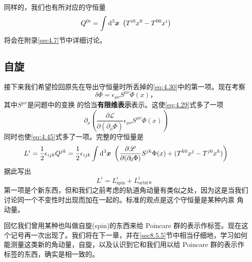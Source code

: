 同样的，我们也有所对应的守恒量
\begin{equation}
Q^{0i}=\int \mathrm d^3 \bm{x}~ \left(T^{i 0} x^0- T^{0 0}x^i\right)
\label{eq:4.46}
\end{equation}
将会在附录\ref{sec4.7}节中详细讨论。

\subsection{自旋}\label{sec4.5.4}
接下来我们希望捡回原先在导出守恒量时所丢掉的\ref{eq:4.30}中的第一项。现在考察
\begin{equation}
\delta\Phi = \epsilon_{\mu\nu} S^{\mu\nu}\Phi(x) \text{，}
\end{equation}
其中$S^{\mu\nu}$是问题中的变换%
%
的恰当{\bf 有限维表示}表示。这使\ref{eq:4.29}式多了一项
\begin{equation}
\partial_\rho \left(\frac{\partial\mathscr L}{\partial (\partial_\rho \Phi)}\epsilon_{\mu\nu}S^{\mu\nu}\Phi(x)\right)
\end{equation}
同时也使\ref{eq:4.45}式多了一项。完整的守恒量是
\begin{equation}
L^i = \frac{1}{2}\epsilon_{ijk}Q^{jk} = \frac{1}{2}\epsilon_{ijk} \int \mathrm d^3 \bm{x}~ \left(\frac{\partial\mathscr L}{\partial (\partial_0 \Phi)}S^{jk}\Phi(x) + (T^{k 0} x^j-T^{j 0}x^k)\right)
\end{equation}
据此写出
\begin{equation}
L^i = L_\text{spin}^i + L_\text{orbit}^i \text{。}
\end{equation}
第一项是个新东西，但和我们之前考虑的轨道角动量有类似之处，因为这是当我们讨论同一个不变性时出现而加在一起的。标准的观点是这个守恒量是某种内禀%
%
角动量。

回忆我们曾用某种也叫做自旋(spin)的东西来给 Poincare 群的表示作标签。现在这个记号再一次出现了。我们将在下一章，并在\ref{sec8.5.5}节中相当仔细地，学习如何能测量这类新的角动量，自旋，以及认识到它和我们用以给 Poincare 群的表示作标签的东西，确实是相一致的。


